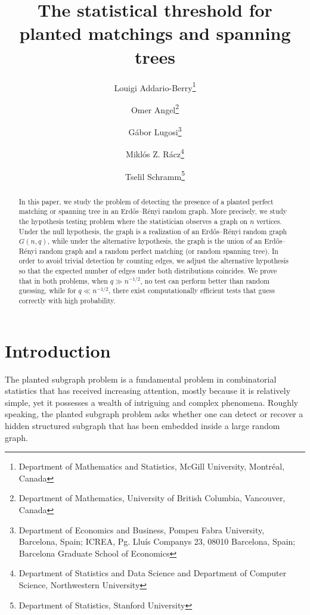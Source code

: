 \documentclass[11pt]{article}
\numberwithin{equation}{section}
\numberwithin{thm}{section}
\begin{document}
\title{The statistical threshold for planted matchings and spanning trees} 
\author{Louigi Addario-Berry\thanks{Department of Mathematics and Statistics, McGill University, Montr\'eal, Canada}
\and
Omer Angel\thanks{Department of Mathematics,
University of British Columbia, Vancouver, Canada}
\and
Gábor Lugosi\thanks{Department of Economics and Business, 
Pompeu  Fabra University, Barcelona, Spain;
ICREA, Pg. Lluís Companys 23, 08010 Barcelona, Spain;
Barcelona Graduate School of Economics}
\and
Miklós Z. Rácz\thanks{Department of Statistics and Data Science and Department of Computer Science, Northwestern University}
\and
Tselil Schramm\thanks{Department of Statistics, Stanford University}}


\maketitle

\begin{abstract} 
In this paper, we study the problem of detecting the presence of a planted perfect matching or spanning tree in an Erd\H{o}s--Rényi random graph. More precisely, we study the hypothesis testing problem where the statistician observes a graph on $n$ vertices. Under the null hypothesis, the graph is a realization of an Erd\H{o}s--Rényi random graph $G(n,q)$, while under the alternative hypothesis, the graph is the union of an 
Erd\H{o}s--Rényi random graph and a random perfect matching (or random spanning tree).
In order to avoid trivial detection by counting edges, we adjust the alternative hypothesis so that the expected number of edges under both distributions coincides. We prove that in both problems, when $q\gg n^{-1/2}$,
no test can perform better than random guessing, while for $q\ll n^{-1/2}$, there exist computationally efficient tests that guess correctly with high 
probability.
\end{abstract}



\section{Introduction}

The planted subgraph problem is a fundamental problem in combinatorial statistics that has received increasing attention, mostly because it is relatively simple, yet it possesses a wealth of intriguing and complex phenomena. Roughly speaking,  the planted subgraph problem asks whether one can detect or recover a hidden structured subgraph that has been embedded inside a large random graph.
\end{document}
